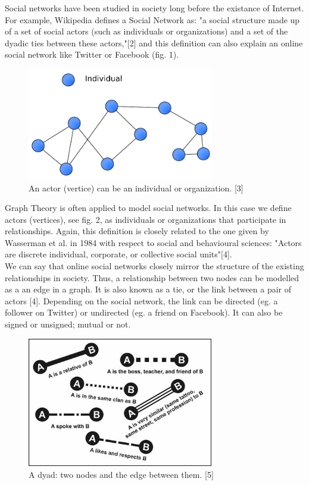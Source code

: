 \documentclass[conference,letterpaper]{IEEEtran}
\begin{document}
\indent
Social networks have been studied in society long before the existance of Internet. For example, Wikipedia defines a Social Network as: "a social structure made up of a set of social actors (such as
individuals or organizations) and a set of the dyadic ties between these actors,"[2] and this definition can also explain an online social network like Twitter or Facebook (fig. 1).\\

\begin{center}
\begin{figure}[hb]
\centering
\includegraphics[width=3.2in]{social-network}
\caption{
An actor (vertice) can be an individual or organization. [3]
}
\label{fig_sim}
\end{figure}
\end{center}
Graph Theory is often applied to model social networks. In this case we define actors (vertices), see fig. 2,  as individuals or organizations that participate in relationships. Again, this definition is closely related to the one given by Wasserman et al. in 1984 with respect to social and behavioural sciences: "Actors are discrete individual, corporate, or collective social units"[4]. \\
We can say that online social networks closely mirror the structure of the existing relationships in society. Thus, a relationship between two nodes can be modelled as a an edge in a graph. It is also known as a tie, or the link between a pair of actors [4]. Depending on the social network, the link can be directed (eg. a follower on Twitter) or undirected (eg. a friend on Facebook). It can also be signed or unsigned; mutual or not. \\

\begin{center}
\begin{figure}[hb]
\centering
\includegraphics[width=3.2in]{f03}
\caption{
A dyad: two nodes and the edge between them. [5]
}
\label{fig_sim}
\end{figure}
\end{center}
\end{document}
